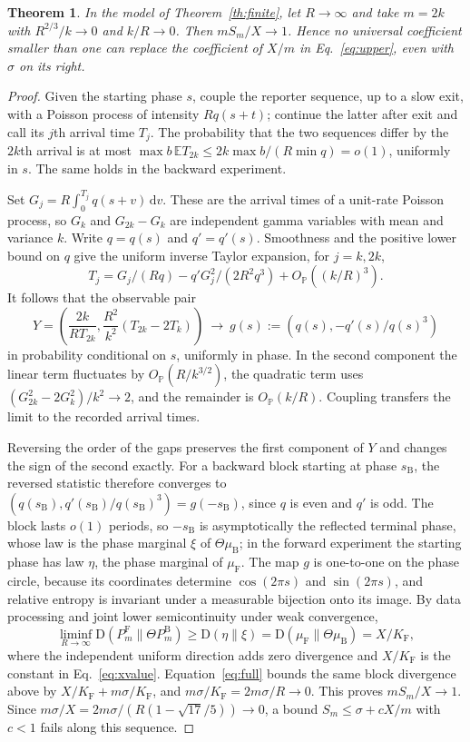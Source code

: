 \documentclass[11pt,a4paper]{article}
\newtheorem{theorem}{Theorem}
\newcommand{\KL}{\mathrm D}
\newcommand{\F}{\mathrm F}
\newcommand{\B}{\mathrm B}
\newcommand{\dd}{\,\mathrm d}
\begin{document}
\begin{theorem}\label{th:sharp}
In the model of Theorem~\ref{th:finite}, let $R\to\infty$ and take $m=2k$ with $R^{2/3}/k\to0$ and $k/R\to0$. Then $mS_m/X\to1$. Hence no universal coefficient smaller than one can replace the coefficient of $X/m$ in Eq.~\eqref{eq:upper}, even with $\sigma$ on its right.
\end{theorem}
\begin{proof}
Given the starting phase $s$, couple the reporter sequence, up to a slow exit, with a Poisson process of intensity $Rq(s+t)$; continue the latter after exit and call its $j$th arrival time $T_j$. The probability that the two sequences differ by the $2k$th arrival is at most $\max b\,\mathbb E T_{2k}\leq 2k\max b/(R\min q)=o(1)$, uniformly in $s$. The same holds in the backward experiment.

Set $G_j=R\int_0^{T_j}q(s+v)\dd v$. These are the arrival times of a unit-rate Poisson process, so $G_k$ and $G_{2k}-G_k$ are independent gamma variables with mean and variance $k$. Write $q=q(s)$ and $q'=q'(s)$. Smoothness and the positive lower bound on $q$ give the uniform inverse Taylor expansion, for $j=k,2k$,
\[
 T_j=G_j/(Rq)-q'G_j^2/(2R^2q^3)+O_{\mathbb P}((k/R)^3).
\]
It follows that the observable pair
\[
 Y=\left(\frac{2k}{RT_{2k}},\frac{R^2}{k^2}(T_{2k}-2T_k)\right)
 \ \longrightarrow\ g(s):=(q(s),-q'(s)/q(s)^3)
\]
in probability conditional on $s$, uniformly in phase. In the second component the linear term fluctuates by $O_{\mathbb P}(R/k^{3/2})$, the quadratic term uses $(G_{2k}^2-2G_k^2)/k^2\to2$, and the remainder is $O_{\mathbb P}(k/R)$. Coupling transfers the limit to the recorded arrival times.

Reversing the order of the gaps preserves the first component of $Y$ and changes the sign of the second exactly. For a backward block starting at phase $s_\B$, the reversed statistic therefore converges to $(q(s_\B),q'(s_\B)/q(s_\B)^3)=g(-s_\B)$, since $q$ is even and $q'$ is odd. The block lasts $o(1)$ periods, so $-s_\B$ is asymptotically the reflected terminal phase, whose law is the phase marginal $\xi$ of $\Theta\mu_\B$; in the forward experiment the starting phase has law $\eta$, the phase marginal of $\mu_\F$. The map $g$ is one-to-one on the phase circle, because its coordinates determine $\cos(2\pi s)$ and $\sin(2\pi s)$, and relative entropy is invariant under a measurable bijection onto its image. By data processing and joint lower semicontinuity under weak convergence,
\[
 \liminf_{R\to\infty}\KL(P_m^\F\|\Theta P_m^\B)\geq
 \KL(\eta\|\xi)=\KL(\mu_\F\|\Theta\mu_\B)=X/K_\F ,
\]
where the independent uniform direction adds zero divergence and $X/K_\F$ is the constant in Eq.~\eqref{eq:xvalue}. Equation~\eqref{eq:full} bounds the same block divergence above by $X/K_\F+m\sigma/K_\F$, and $m\sigma/K_\F=2m\sigma/R\to0$. This proves $mS_m/X\to1$. Since $m\sigma/X=2m\sigma/(R(1-\sqrt{17}/5))\to0$, a bound $S_m\le\sigma+cX/m$ with $c<1$ fails along this sequence.
\end{proof}
\end{document}
